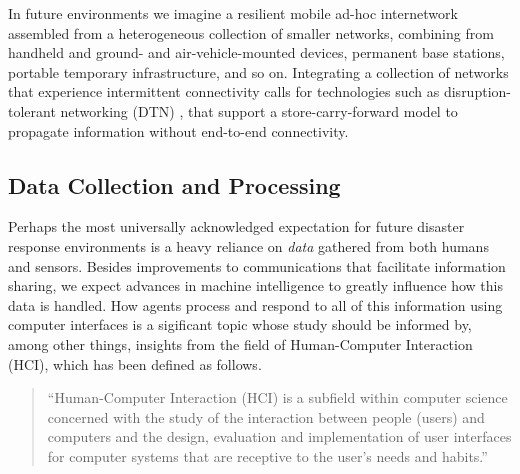 \documentclass[]             %
{NASA}                       %
\theoremstyle{definition}
\begin{document}
In future environments we imagine a resilient mobile ad-hoc
internetwork assembled from a heterogeneous collection of smaller
networks, combining from handheld and ground- and air-vehicle-mounted
devices, permanent base stations, portable temporary infrastructure,
and so on. Integrating a collection of networks that experience
intermittent connectivity calls for technologies such as
disruption-tolerant networking (DTN) \cite{2021:intro-dtn}, that
support a store-carry-forward model to propagate information without
end-to-end connectivity.

\subsection{Data Collection and Processing}
\label{ssec:data-collection}
Perhaps the most universally acknowledged expectation for future
disaster response environments is a heavy reliance on \emph{data}
gathered from both humans and sensors. Besides improvements to
communications that facilitate information sharing, we expect advances
in machine intelligence to greatly influence how this data is
handled. How agents process and respond to all of this information
using computer interfaces is a sigificant topic whose study should be
informed by, among other things, insights from the field of
Human-Computer Interaction (HCI), which has been defined as follows.
\begin{quote}
  ``Human-Computer Interaction (HCI) is a subfield within computer
  science concerned with the study of the interaction between people
  (users) and computers and the design, evaluation and implementation
  of user interfaces for computer systems that are receptive to the
  user's needs and habits.'' \cite{2009:hci-definition}
\end{quote}
\end{document}
